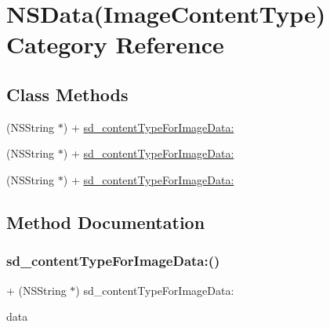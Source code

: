 \hypertarget{category_n_s_data_07_image_content_type_08}{}\section{N\+S\+Data(Image\+Content\+Type) Category Reference}
\label{category_n_s_data_07_image_content_type_08}
\subsection*{Class Methods}
\begin{DoxyCompactItemize}
\item 
(N\+S\+String $\ast$) + \mbox{\hyperlink{category_n_s_data_07_image_content_type_08_a340efb5aba79e8fe7addfd44a335a23b}{sd\+\_\+content\+Type\+For\+Image\+Data\+:}}
\item 
(N\+S\+String $\ast$) + \mbox{\hyperlink{category_n_s_data_07_image_content_type_08_a340efb5aba79e8fe7addfd44a335a23b}{sd\+\_\+content\+Type\+For\+Image\+Data\+:}}
\item 
(N\+S\+String $\ast$) + \mbox{\hyperlink{category_n_s_data_07_image_content_type_08_a340efb5aba79e8fe7addfd44a335a23b}{sd\+\_\+content\+Type\+For\+Image\+Data\+:}}
\end{DoxyCompactItemize}


\subsection{Method Documentation}
\mbox{\label{category_n_s_data_07_image_content_type_08_a340efb5aba79e8fe7addfd44a335a23b}} 
\subsubsection{\texorpdfstring{sd\+\_\+content\+Type\+For\+Image\+Data\+:()}{sd\_contentTypeForImageData:()}\hspace{0.1cm}{\footnotesize\ttfamily [1/3]}}
{\footnotesize\ttfamily + (N\+S\+String $\ast$) sd\+\_\+content\+Type\+For\+Image\+Data\+: \begin{DoxyParamCaption}\item[{(N\+S\+Data $\ast$)}]{data }\end{DoxyParamCaption}}

